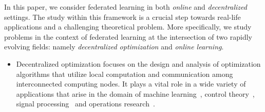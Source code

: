 In this paper, we consider federated learning in both \emph{online} and \emph{decentralized} settings. 
The study within this framework is a crucial step towards real-life applications and 
a challenging theoretical problem. 
More specifically, we study problems in the context of federated learning at the intersection of two rapidly 
evolving fields: namely \emph{decentralized optimization} and \emph{online learning}. 
%
\begin{itemize}
\item
Decentralized optimization focuses on the design and analysis of 
optimization algorithms that utilize local computation and communication among interconnected computing nodes.
It plays a vital role in a wide variety of applications that arise in the domain of 
machine learning~\cite{Deori:2016,Zheng:2018,Tsianos:2012b}, control theory~\cite{Liu:2010,Cao:2013}, signal processing~\cite{Reisizadeh:2019} and operations research~\cite{Recht:2012}.  

%

 

\end{itemize}
